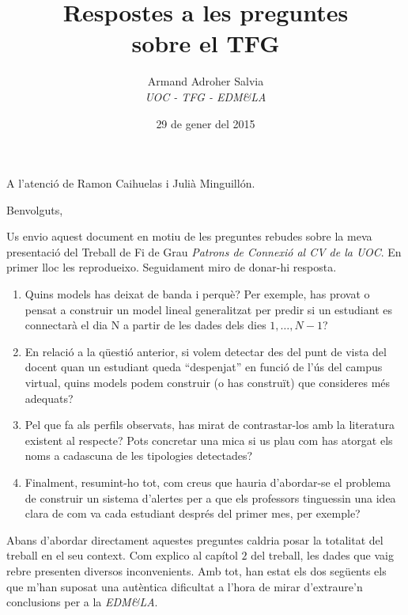 \documentclass[
	a4paper,
	twoside,
	justified
]{tufte-handout}
\title{Respostes a les preguntes \\
				sobre el TFG}
\date{29 de gener del 2015}
\author{Armand Adroher Salvia\\
	{\it UOC - TFG - EDM\&LA}}
\begin{document}
\maketitle

\noindent A l'atenció de Ramon Caihuelas i Julià Minguillón.

\noindent Benvolguts,
 
Us envio aquest document en motiu de les preguntes rebudes sobre la meva presentació del Treball de Fi de Grau \emph{Patrons de Connexió al CV de la UOC}. En primer lloc les reprodueixo. Seguidament miro de donar-hi resposta.

{\itshape
\begin{enumerate}[(1)]
  \item \label{q:1}  
  Quins models has deixat de banda i perquè? Per exemple, has provat o pensat a construir un model lineal generalitzat per predir si un estudiant es connectarà el dia N a partir de les dades dels dies $1,\ldots,N-1$?
  \item \label{q:2} 
  En relació a la qüestió anterior, si volem detectar des del punt de vista del docent quan un estudiant queda ``despenjat'' en funció de l’ús del campus virtual, quins models podem construir (o has construït) que consideres més adequats?
  \item \label{q:3}
  Pel que fa als perfils observats, has mirat de contrastar-los amb la literatura existent al respecte? Pots concretar una mica si us plau com has atorgat els noms a cadascuna de les tipologies detectades?
  \item  \label{q:4} 
  Finalment, resumint-ho tot, com creus que hauria d’abordar-se el problema de construir un sistema d’alertes per a que els professors tinguessin una idea clara de com va cada estudiant després del primer mes, per exemple?  
\end{enumerate}
}

Abans d'abordar directament aquestes preguntes caldria posar la totalitat del treball en el seu context. Com explico al capítol $2$ del treball, les dades que vaig rebre presenten diversos inconvenients. Amb tot, han estat els dos següents els que m'han suposat una autèntica dificultat a l'hora de mirar d'extraure'n conclusions per a la \emph{EDM\&LA}.   
\end{document}
